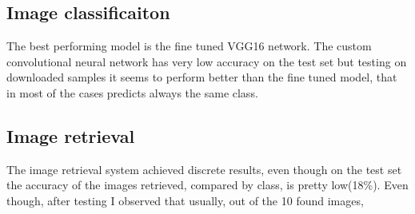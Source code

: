 \documentclass[12pt,journal,compsoc]{IEEEtran}
\begin{document}
\subsection{Image classificaiton}
The best performing model is the fine tuned VGG16 network. The custom convolutional neural network has very low accuracy on the test set but testing on downloaded samples it seems to perform better than the fine tuned model, that in most of the cases predicts always the same class.

\subsection{Image retrieval}
The image retrieval system achieved discrete results, even though on the test set the accuracy of the images retrieved, compared by class, is pretty low(18\%). Even though, after testing I observed that usually, out of the 10 found images, 

\nocite{*}
\printbibliography
\end{document}
